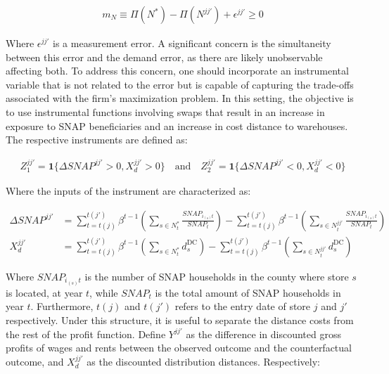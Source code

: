 \documentclass[11.5pt]{article}
\begin{document}
\begin{align}
    m_N \equiv \Pi(N^*) - \Pi(N^{jj'}) + \epsilon^{jj'} \geq 0
\end{align}



   Where $\epsilon^{jj'}$ is a measurement error. A significant concern is the simultaneity between this error and the demand error, as there are likely unobservable affecting both. To address this concern, one should incorporate an instrumental variable that is not related to the error but is capable of capturing the trade-offs associated with the firm's maximization problem. In this setting, the objective is to use instrumental functions involving swaps that result in an increase in exposure to SNAP beneficiaries and an increase in cost distance to warehouses. The respective instruments are defined as:

   \begin{align}
       Z^{jj'}_1 = \mathbf{1}\{\Delta SNAP^{jj'} > 0, X_d^{jj'} > 0\} \quad \text{and} \quad  Z^{jj'}_2 = \mathbf{1}\{\Delta SNAP^{jj'} < 0, X_d^{jj'} < 0\}
   \end{align}

   Where the inputs of the instrument are characterized as:

     \begin{align*}
      \Delta SNAP^{jj'} & = \sum_{t=t(j)}^{t(j')} \beta^{t-1} \left( \sum_{s \in N_t^*} \frac{SNAP_{i_{(s)}t}}{SNAP_t}\right) -   \sum_{t=t(j)}^{t(j')} \beta^{t-1} \left( \sum_{s \in N_t^{jj'}} \frac{SNAP_{i_{(s)}t}}{SNAP_t}\right) \\
           X^{jj'}_d & =  \sum_{t=t(j)}^{t(j')} \beta^{t-1} \left( \sum_{s \in N_t^*}  d^\text{DC}_s \right)  -  \sum_{t=t(j)}^{t(j')} \beta^{t-1} \left( \sum_{s \in N_t^{jj'}} d^\text{DC}_s \right) 
  \end{align*}
  
   
   
  Where $SNAP_{i_{(s)}t}$ is the number of SNAP households in the county where store $s$ is located, at year $t$, while $SNAP_t$ is the total amount of SNAP households in year $t$. Furthermore, $t(j)$ and $t(j')$ refers to the entry date of store $j$ and $j'$ respectively. Under this structure, it is useful to separate the distance costs from the rest of the profit function. Define $Y^{jj'}$ as the difference in discounted gross profits of wages and rents between the observed outcome and the counterfactual outcome, and $X^{jj'}_d$ as the discounted distribution distances. Respectively:
\end{document}

